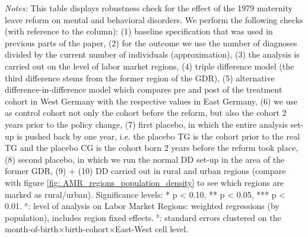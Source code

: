 \begin{landscape}
\begin{table}[htbp]
\begin{minipage}{0.87\linewidth}
		\scriptsize \emph{Notes:} This table displays robustness check for the effect of the 1979 maternity leave reform on mental and behavioral disorders. We perform the following checks (with reference to the column): (1) baseline specification that was used in previous parts of the paper, (2) for the outcome we use the number of diagnoses divided by the current number of individuals (approximation), (3) the analysis is carried out on the level of labor market regions, (4) triple difference model (the third difference stems from the former region of the GDR), (5) alternative difference-in-difference model which compares pre and post of the treatment cohort in West Germany with the respective values in East Germany, (6) we use as control cohort not only the cohort before the reform, but also the cohort 2 years prior to the policy change, (7) first placebo, in which the entire analysis set-up is pushed back by one year, i.e. the placebo TG is the cohort prior to the real TG and the placebo CG is the cohort born 2 years before the reform took place, (8) second placebo, in which we run the normal DD set-up in the area of the former GDR, (9) + (10)  DD carried out in rural and urban regions (compare with figure \ref{fig: AMR_regions_population_density} to see which regions are marked as rural/urban). \newline Significance levels: * p < 0.10, ** p < 0.05, *** p < 0.01. \newline
		\hspace*{15 pt}$^a$: level of analysis on Labor Market Regions: weighted regressions (by population), includes region fixed effects.\newline
		\hspace*{15 pt}$^b$: standard errors clustered on the month-of-birth$\times$birth-cohort$\times$East-West cell level.
	\end{minipage}
\end{table} 
	\vspace*{\fill}\clearpage
\end{landscape}




